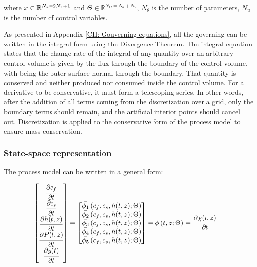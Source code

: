 \documentclass[../Article_Model_Parameters.tex]{subfiles}
\begin{document}
		where ${\color{black}x} \in \mathbb{R}^{N_x = 2N_z+1} $ and $\Theta \in \mathbb{R}^{N_\Theta =  N_{\theta} + N_u } $, $N_{\theta}$ is the number of parameters, $N_{u}$ is the number of control variables.
		
		As presented in Appendix \ref{CH: Gouverning equations}, all the governing can be written in the integral form using the Divergence Theorem. The integral equation states that the change rate of the integral of any quantity over an arbitrary control volume is given by the flux through the boundary of the control volume, with being the outer surface normal through the boundary. That quantity is conserved and neither produced nor consumed inside the control volume. For a derivative to be conservative, it must form a telescoping series. In other words, after the addition of all terms coming from the discretization over a grid, only the boundary terms should remain, and the artificial interior points should cancel out. Discretization is applied to the conservative form of the process model to ensure mass conservation.
	
		\iffalse
		\subsubsection{State-space representation} \label{CH: State_space}
			
		The process model can be written in a general form:
			
		{\footnotesize
			\begin{align}
				\begin{bmatrix}
					\cfrac{\partial c_f}{\partial t}\\
					\cfrac{\partial c_s}{\partial t}\\
					\cfrac{\partial {\color{black}h}(t,z)}{\partial t} \\
					\cfrac{\partial {\color{black}P}(t,z)}{\partial t} \\
					\cfrac{\partial {\color{black}y}(t)}{\partial t} 
				\end{bmatrix}
				& =
				\begin{bmatrix}
					{\color{black}\bar{\phi_1}} \left( c_f,c_s,{\color{black}h}(t,z); \Theta \right)\\
					{\color{black}\bar{\phi_2}} \left( c_f,c_s,{\color{black}h}(t,z); \Theta \right)\\
					{\color{black}\bar{\phi_3}} \left( c_f,c_s,{\color{black}h}(t,z); \Theta \right) \\
					{\color{black}\bar{\phi_4}} \left( c_f,c_s,{\color{black}h}(t,z); \Theta \right)\\
					{\color{black}\bar{\phi_5}} \left( c_f,c_s,{\color{black}h}(t,z); \Theta \right)
				\end{bmatrix} = {\color{black}\bar{\phi}} \left( t,z; \Theta \right) = \cfrac{\partial {\color{black}\chi}(t,z)}{\partial t}
		\end{align} }
			
\end{document}
